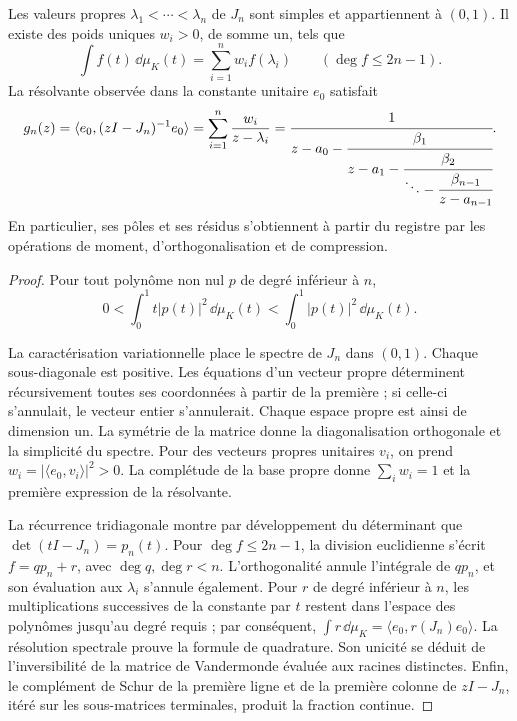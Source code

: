 \begin{theorem}
\label{thm:jacobi-residues}
Les valeurs propres \(\lambda_1<\cdots<\lambda_n\) de \(J_n\) sont simples et appartiennent à \((0,1)\). Il existe des poids uniques \(w_i>0\), de somme un, tels que
\begin{equation}
 \int f(t)\,\dd\mu_K(t)=\sum_{i=1}^{n}w_i f(\lambda_i)
 \qquad(\deg f\leq2n-1).
 \label{eq:jacobi-quadrature}
\end{equation}
La résolvante observée dans la constante unitaire \(e_0\) satisfait
\begin{equation}
 g_n(z)=\langle e_0,(zI-J_n)^{-1}e_0\rangle
       =\sum_{i=1}^{n}\frac{w_i}{z-\lambda_i}
       =\cfrac1{z-a_0-\cfrac{\beta_1}{z-a_1-
          \cfrac{\beta_2}{\ddots-\cfrac{\beta_{n-1}}{z-a_{n-1}}}}}.
 \label{eq:jacobi-resolvent}
\end{equation}
En particulier, ses pôles et ses résidus s’obtiennent à partir du registre par les
opérations de moment, d’orthogonalisation et de compression.
\end{theorem}
\begin{proof}
Pour tout polynôme non nul \(p\) de degré inférieur à \(n\),
\[
 0<\int_0^1 t|p(t)|^2\,\dd\mu_K(t)
   <\int_0^1 |p(t)|^2\,\dd\mu_K(t).
\]

La caractérisation variationnelle place le spectre de \(J_n\) dans
\((0,1)\). Chaque sous-diagonale est positive. Les équations d’un vecteur propre
déterminent récursivement toutes ses coordonnées à partir de la première ;
si celle-ci s’annulait, le vecteur entier s’annulerait. Chaque espace propre est
ainsi de dimension un. La symétrie de la matrice donne la diagonalisation orthogonale
et la simplicité du spectre. Pour des vecteurs propres unitaires \(v_i\), on prend
\(w_i=|\langle e_0,v_i\rangle|^2>0\). La complétude de la base
propre donne \(\sum_iw_i=1\) et la première expression de la résolvante.

La récurrence tridiagonale montre par développement du déterminant que \(\det(tI-J_n)=p_n(t)\). Pour \(\deg f\leq2n-1\), la division euclidienne s'écrit \(f=qp_n+r\), avec \(\deg q,\deg r<n\). L'orthogonalité annule l'intégrale de \(qp_n\), et son évaluation aux \(\lambda_i\) s'annule également. Pour \(r\) de degré inférieur à \(n\), les multiplications successives de la constante par \(t\) restent dans l'espace des polynômes jusqu'au degré requis ; par conséquent, \(\int r\,\dd\mu_K=\langle e_0,r(J_n)e_0\rangle\). La résolution spectrale prouve la formule de quadrature. Son unicité se déduit de l'inversibilité de la matrice de Vandermonde évaluée aux racines distinctes. Enfin, le complément de Schur de la première ligne et de la première colonne de \(zI-J_n\), itéré sur les sous-matrices terminales, produit la fraction continue.
\end{proof}

